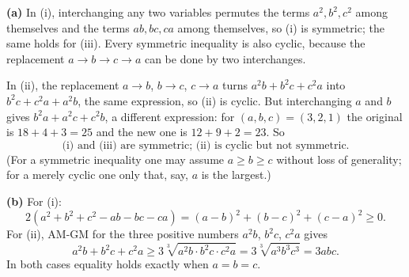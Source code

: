 \textbf{(a)} In (i), interchanging any two variables permutes the terms $a^2,b^2,c^2$ among themselves and the terms $ab,bc,ca$ among themselves, so (i) is symmetric; the same holds for (iii). Every symmetric inequality is also cyclic, because the replacement $a\to b\to c\to a$ can be done by two interchanges.

In (ii), the replacement $a\to b$, $b\to c$, $c\to a$ turns $a^2b+b^2c+c^2a$ into $b^2c+c^2a+a^2b$, the same expression, so (ii) is cyclic. But interchanging $a$ and $b$ gives $b^2a+a^2c+c^2b$, a different expression: for $(a,b,c)=(3,2,1)$ the original is $18+4+3=25$ and the new one is $12+9+2=23$. So
\[
\boxed{\text{(i) and (iii) are symmetric; (ii) is cyclic but not symmetric.}}
\]
(For a symmetric inequality one may assume $a\ge b\ge c$ without loss of generality; for a merely cyclic one only that, say, $a$ is the largest.)

\textbf{(b)} For (i):
\[
2\left(a^2+b^2+c^2-ab-bc-ca\right)=(a-b)^2+(b-c)^2+(c-a)^2\ge0 .
\]
For (ii), AM-GM for the three positive numbers $a^2b$, $b^2c$, $c^2a$ gives
\[
a^2b+b^2c+c^2a\ge3\sqrt[3]{a^2b\cdot b^2c\cdot c^2a}=3\sqrt[3]{a^3b^3c^3}=3abc .
\]
In both cases equality holds exactly when $a=b=c$.
